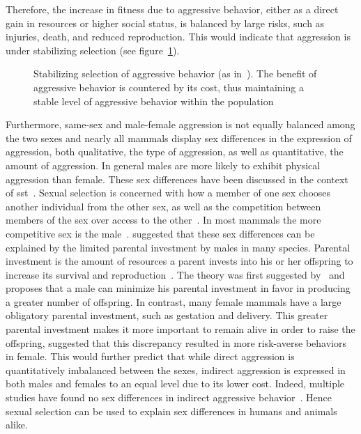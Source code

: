Therefore, the increase in fitness due to aggressive behavior, either as a direct gain in resources or higher social status, is balanced by large risks, such as injuries, death, and reduced reproduction.
This would indicate that aggression is under stabilizing selection (see figure~\ref{fig:stab}).

\begin{figure}[hp]
	\centering
	\scalebox{0.6}{}
  \caption[Stabilizing selection of aggressive behavior]{Stabilizing selection of aggressive behavior (as in~\citet{Anholt2012}).
  The benefit of aggressive behavior is countered by its cost, thus maintaining a stable level of aggressive behavior within the population}\label{fig:stab}
\end{figure}

Furthermore, same-sex and male-female aggression is not equally balanced among the two sexes and nearly all mammals display sex differences in the expression of aggression, both
qualitative, the type of aggression, as well as quantitative, the amount of aggression.
In general males are more likely to exhibit physical aggression than female.
These sex differences have been discussed in the context of \acrfull{sst}~\cite{Archer2004,Anderson2002,Archer2009}. 
Sexual selection is concerned with how a member of one sex chooses another individual from the other sex, as well as the competition between members of the sex over access to the other~\cite{Darwin1859}.
In most mammals the more competitive sex is the male~\cite{Archer2009}. 
\citet{Trivers1972} suggested that these sex differences can be explained by the limited parental investment by males in many species.
Parental investment is the amount of resources a parent invests into his or her offspring to increase its survival and reproduction~\cite{Archer2009}.
The theory was first suggested by~\citet{0198504403} and proposes that a male can minimize his parental investment in favor in producing a greater number of offspring.
In contrast, many female mammals have a large obligatory parental investment, such as gestation and delivery.
This greater parental investment makes it more important to remain alive in order to raise the offspring,
\citet{Campbell1999} suggested that this discrepancy resulted in more risk-averse behaviors in female.
This would further predict that while direct aggression is quantitatively imbalanced between the sexes, indirect aggression is expressed in both males and females to an equal level due to its lower cost.
Indeed, multiple studies have found no sex differences in indirect aggressive behavior~\cite{NoelCard2008}.
Hence sexual selection can be used to explain sex differences in humans and animals alike.

